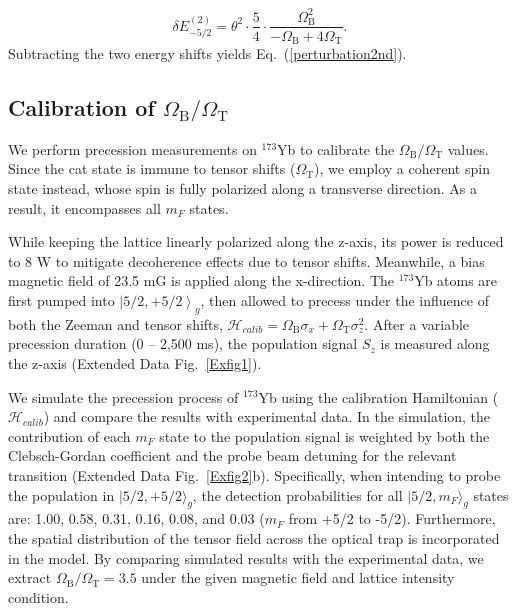 \documentclass[pdflatex,sn-nature,centre]{sn-jnl}%
\begin{document}
\begin{equation}\label{E-5/2}
    \delta E_{-5/2}^{(2)} = \theta^2\cdot\dfrac{5}{4}\cdot\dfrac{\Omega_{\mathrm B}^2}{-\Omega_{\mathrm B}+4\Omega_{\mathrm T}}.
\end{equation}
Subtracting the two energy shifts yields Eq.~(\ref{perturbation2nd}).


\subsection*{Calibration of $\Omega_{\mathrm B}/\Omega_{\mathrm T}$ }\label{BtoT}

We perform precession measurements on $^{173}$Yb to calibrate the $\Omega_{\mathrm B}/\Omega_{\mathrm T}$ values. Since the cat state is immune to tensor shifts ($\Omega_{\mathrm T}$), we employ a coherent spin state instead, whose spin is fully polarized along a transverse direction. As a result, it encompasses all $m_F$ states.

While keeping the lattice linearly polarized along the z-axis, its power is reduced to 8 W to mitigate decoherence effects due to tensor shifts. Meanwhile, a bias magnetic field of 23.5 mG is applied along the x-direction. The $^{173}$Yb atoms are first pumped into $\left\vert5/2,+5/2\right\rangle_g$, then allowed to precess under the influence of both the Zeeman and tensor shifts, $\mathscr{H}_{calib} = \Omega_{\mathrm B}\sigma_x + \Omega_{\mathrm T}\sigma_z^2$. After a variable precession duration (0 – 2,500 ms), the population signal $S_z$ is measured along the z-axis (Extended Data Fig.~\ref{Exfig1}).

We simulate the precession process of $^{173}$Yb using the calibration Hamiltonian ($\mathscr{H}_{calib}$) and compare the results with experimental data. In the simulation, the contribution of each $m_F$ state to the population signal is weighted by both the Clebsch-Gordan coefficient and the probe beam detuning for the relevant transition (Extended Data Fig.~\ref{Exfig2}b). Specifically, when intending to probe the population in $\lvert5/2,+5/2\rangle_g$, the detection probabilities for all $\lvert5/2,m_F\rangle_g$ states are: 1.00, 0.58, 0.31, 0.16, 0.08, and 0.03 ($m_F$ from +5/2 to -5/2). Furthermore, the spatial distribution of the tensor field across the optical trap is incorporated in the model. By comparing simulated results with the experimental data, we extract $\Omega_{\mathrm B}/\Omega_{\mathrm T}=3.5$ under the given magnetic field and lattice intensity condition.
\end{document}
